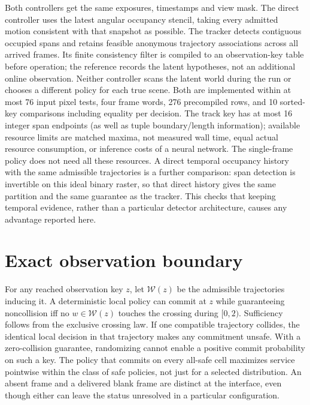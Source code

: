 \documentclass[11pt]{article}
\begin{document}
Both controllers get the same exposures, timestamps and view mask. The direct controller uses the latest angular occupancy stencil, taking every admitted motion consistent with that snapshot as possible. The tracker detects contiguous occupied spans and retains feasible anonymous trajectory associations across all arrived frames. Its finite consistency filter is compiled to an observation-key table before operation; the reference records the latent hypotheses, not an additional online observation. Neither controller scans the latent world during the run or chooses a different policy for each true scene. Both are implemented within at most 76 input pixel tests, four frame words, 276 precompiled rows, and 10 sorted-key comparisons including equality per decision. The track key has at most 16 integer span endpoints (as well as tuple boundary/length information); available resource limits are matched maxima, not measured wall time, equal actual resource consumption, or inference costs of a neural network. The single-frame policy does not need all these resources. A direct temporal occupancy history with the same admissible trajectories is a further comparison: span detection is invertible on this ideal binary raster, so that direct history gives the same partition and the same guarantee as the tracker. This checks that keeping temporal evidence, rather than a particular detector architecture, causes any advantage reported here.

\section{Exact observation boundary}

For any reached observation key $z$, let $\mathcal W(z)$ be the admissible trajectories inducing it. A deterministic local policy can commit at $z$ while guaranteeing noncollision iff no $w\in\mathcal W(z)$ touches the crossing during $[0,2)$. Sufficiency follows from the exclusive crossing law. If one compatible trajectory collides, the identical local decision in that trajectory makes any commitment unsafe. With a zero-collision guarantee, randomizing cannot enable a positive commit probability on such a key. The policy that commits on every all-safe cell maximizes service pointwise within the class of safe policies, not just for a selected distribution. An absent frame and a delivered blank frame are distinct at the interface, even though either can leave the status unresolved in a particular configuration.
\end{document}
